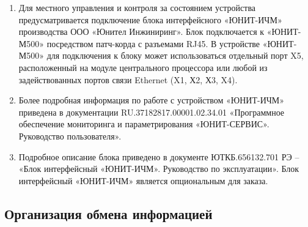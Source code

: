 \begin{enumerate}[label=\arabic{section}.\arabic{subsection}.\arabic*, labelsep=4pt, leftmargin=0pt, itemindent=57pt]
\begin{enumerate}[label=\arabic{section}.\arabic{subsection}.\arabic{enumi}.\arabic*, labelsep=4pt, leftmargin=0em, itemindent=65pt, parsep=0pt]

\item
Для местного управления и контроля за состоянием устройства предусматривается подключение блока интерфейсного «ЮНИТ-ИЧМ» производства ООО «Юнител Инжиниринг».
Блок подключается к «ЮНИТ-М500» посредством патч-корда с разъемами RJ45. В устройстве «ЮНИТ-М500» для подключения к блоку может использоваться отдельный порт X5, расположенный на модуле центрального процессора или любой из задействованных портов связи Ethernet (X1, Х2, Х3, X4).

\item
Более подробная информация по работе с устройством «ЮНИТ-ИЧМ» приведена в документации RU.37182817.00001.02.34.01 «Программное обеспечение мониторинга и параметрирования «ЮНИТ-СЕРВИС». Руководство пользователя».

\item
Подробное описание блока приведено в документе ЮТКБ.656132.701 РЭ – «Блок интерфейсный «ЮНИТ-ИЧМ». Руководство по эксплуатации». Блок интерфейсный «ЮНИТ-ИЧМ» является опциональным для заказа.

\end{enumerate}

\end{enumerate}


\color{unidarkgreen}\subsection{Организация обмена информацией}\color{black}

